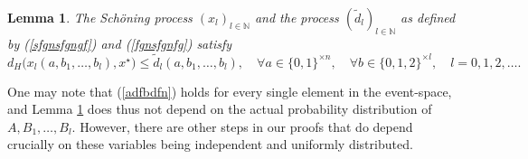 \documentclass[a4paper,aps,floatfix]{revtex4}
\newtheorem{lemma}[theorem]{Lemma}
\begin{document}
\begin{lemma}
\label{bound}
The Sch\"oning process $(x_l)_{l\in\mathbb{N}}$ and the process $(\tilde{d}_l)_{l\in \mathbb{N}}$ as defined by  (\ref{sfgnsfgngf}) and (\ref{fgnsfgnfg}) satisfy 
  \begin{equation}
  \label{adfbdfn}
d_H\big(x_l(a,b_{1},\ldots,b_{l}),x^{\star}\big) \leq \tilde{d}_l(a,b_{1},\ldots,b_{l}),\quad \forall a\in\{0,1\}^{\times n},\quad \forall b\in\{0,1,2\}^{\times l},\quad l = 0,1,2,\ldots.
\end{equation}
\end{lemma}
One may note that (\ref{adfbdfn}) holds for every single element in the event-space, and Lemma \ref{bound} does thus not depend on the actual probability distribution of $A,B_1,\ldots, B_l$. However, there are other steps in our proofs that do depend crucially on these variables being independent and uniformly distributed.
\end{document}
